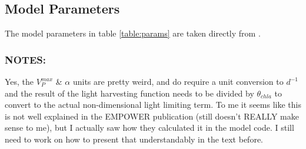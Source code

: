 \documentclass[journal abbreviation, manuscript]{copernicus}
\begin{document}
\subsection{Model Parameters}
The model parameters in table \ref{table:params} are taken directly from \citet{Anderson2015c}.

%
\subsubsection{NOTES:}
Yes, the $V^{max}_P$ \& $\alpha$  units are pretty weird, and do require a unit conversion to $d^{-1}$ and the result of the light harvesting function needs to be divided by $\theta_{chla}$ to convert to the actual non-dimensional light limiting term. To me it seems like this is not well explained in the EMPOWER publication (still doesn't REALLY make sense to me), but I actually saw how they calculated it in the model code. I still need to work on how to present that understandably in the text before. 

%
%
\end{document}
